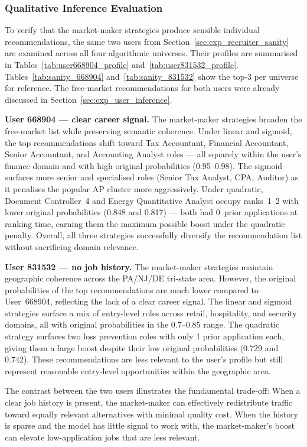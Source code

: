\subsubsection{Qualitative Inference Evaluation}
\label{sec:exp_job_congestion_sanity}
To verify that the market-maker strategies produce sensible individual
recommendations, the same two users from Section~\ref{sec:exp_recruiter_sanity}
are examined across all four algorithmic universes. Their profiles are
summarised in Tables~\ref{tab:user668904_profile} and~\ref{tab:user831532_profile}. Tables~\ref{tab:sanity_668904} and~\ref{tab:sanity_831532} show the top-3
per universe for reference. The free-market recommendations for both users
were already discussed in Section~\ref{sec:exp_user_inference}.

\textbf{User 668904 — clear career signal.} The market-maker strategies
broaden the free-market list while preserving semantic coherence. Under
linear and sigmoid, the top recommendations shift toward Tax Accountant,
Financial Accountant, Senior Accountant, and Accounting Analyst roles ---
all squarely within the user's finance domain and with high original
probabilities (0.95--0.98). The sigmoid surfaces more senior and specialised
roles (Senior Tax Analyst, CPA, Auditor) as it penalises the popular AP
cluster more aggressively. Under quadratic, Document Controller~4 and Energy
Quantitative Analyst occupy ranks~1--2 with lower original probabilities
(0.848 and 0.817) --- both had 0~prior applications at ranking time, earning
them the maximum possible boost under the quadratic penalty. Overall, all
three strategies successfully diversify the recommendation list without
sacrificing domain relevance.

\textbf{User 831532 — no job history.} The market-maker strategies maintain
geographic coherence across the PA/NJ/DE tri-state area. However, the original probabilities of the top recommendations are much lower compared to User~668904, reflecting the lack of a clear career signal. The linear and sigmoid strategies surface a mix of entry-level roles across retail, hospitality, and security domains, all with original probabilities in the 0.7--0.85 range. The quadratic strategy surfaces two loss prevention roles with only 1 prior application each, giving them a large boost despite their low original probabilities (0.729 and 0.742). These recommendations are less relevant to the user's profile but still represent reasonable entry-level opportunities within the geographic area.

The contrast between the two users illustrates the fundamental trade-off: When a clear job history is present, the market-maker can effectively redistribute traffic toward equally relevant alternatives with minimal quality cost. When the history is sparse and the model has little signal to work with, the market-maker's boost can elevate low-application jobs that are less relevant. 

